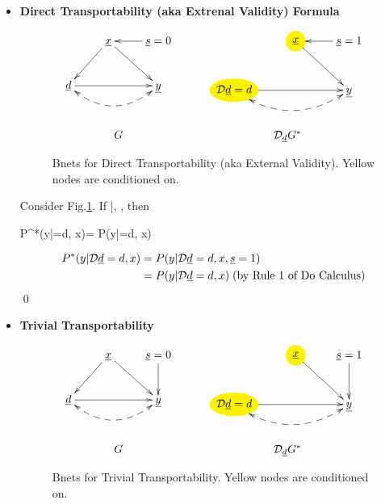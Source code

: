 \begin{itemize}
\item{\bf Direct Transportability 
(aka Extrenal Validity) Formula}

\begin{figure}[h!]
$$
\begin{array}{ccc}
\xymatrix{
&\rvx\ar[ld]\ar[rd]
&\rvs=0\ar[l]
\\
\rvd\ar[rr]\ar@{<-->}@/_1.5pc/[rr]
&&\rvy
}
&
\;\;\;\;
&
\xymatrix{
&*++[o][F*:yellow]{\rvx}\ar[rd]
&\rvs=1\ar[l]
\\
*++[o][F*:yellow]{\cald\rvd=d}\ar[rr]
\ar@{<-->}@/_1.5pc/[rr]
&&\rvy
}
\\
\\
\\
G&&\cald_\rvd G^*
\end{array}
$$
\caption{Bnets for Direct Transportability
(aka External Validity).
Yellow nodes are conditioned on.}
\label{fig-direct-trans}
\end{figure}

\begin{claim} Consider Fig.\ref{fig-direct-trans}. If 
\beq
\rvy\perp \rvs|\rvx, \rvd
\;\;\;\;
\;,
\eeq
then

\beq
P^*(y|\cald\rvd=d, x)=
P(y|\cald\rvd=d, x)
\eeq
\end{claim}
\proof
\begin{align}
P^*(y|{\cal D}{\underline{d}}=d, x)
&=
P(y|{\cal D}{\underline{d}}=d, x, {\underline{s}}=1)
\\
&=
P(y|{\cal D}{\underline{d}}=d, x)\;\text{(by Rule 1 of Do Calculus)}
\end{align}
\qed
\item {\bf Trivial Transportability}

\begin{figure}[h!]
$$
\begin{array}{ccc}
\xymatrix{
&\rvx\ar[ld]\ar[rd]
&\rvs=0\ar[d]
\\
\rvd\ar[rr]\ar@{<-->}@/_1.5pc/[rr]
&&\rvy
}
&
\;\;\;\;
&
\xymatrix{
&*++[o][F*:yellow]{\rvx}\ar[rd]
&\rvs=1\ar[d]
\\
*++[o][F*:yellow]{\cald\rvd=d}\ar[rr]
\ar@{<-->}@/_1.5pc/[rr]
&&\rvy
}
\\
\\
\\
G&&\cald_\rvd G^*
\end{array}
$$
\caption{Bnets for Trivial Transportability.
Yellow nodes are conditioned on.}
\label{fig-trivial-trans}
\end{figure}


\end{itemize}
